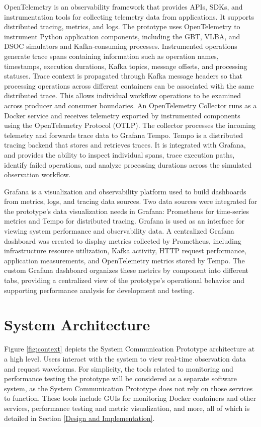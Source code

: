 \documentclass[12pt]{article}
\begin{document}
OpenTelemetry is an observability framework that provides APIs, SDKs, and instrumentation tools for collecting telemetry data from applications. It supports distributed tracing, metrics, and logs. The prototype uses OpenTelemetry to instrument Python application components, including the GBT, VLBA, and DSOC simulators and Kafka-consuming processes. Instrumented operations generate trace spans containing information such as operation names, timestamps, execution durations, Kafka topics, message offsets, and processing statuses. Trace context is propagated through Kafka message headers so that processing operations across different containers can be associated with the same distributed trace. This allows individual workflow operations to be examined across producer and consumer boundaries. An OpenTelemetry Collector runs as a Docker service and receives telemetry exported by instrumented components using the OpenTelemetry Protocol (OTLP). The collector processes the incoming telemetry and forwards trace data to Grafana Tempo. Tempo is a distributed tracing backend that stores and retrieves traces. It is integrated with Grafana, and provides the ability to inspect individual spans, trace execution paths, identify failed operations, and analyze processing durations across the simulated observation workflow.

Grafana is a visualization and observability platform used to build dashboards from metrics, logs, and tracing data sources. Two data sources were integrated for the prototype's data visualization needs in Grafana: Prometheus for time-series metrics and Tempo for distributed tracing. Grafana is used as an interface for viewing system performance and observability data. A centralized Grafana dashboard was created to display metrics collected by Prometheus, including infrastructure resource utilization, Kafka activity, HTTP request performance, application measurements, and OpenTelemetry metrics stored by Tempo. The custom Grafana dashboard organizes these metrics by component into different tabs, providing a centralized view of the prototype's operational behavior and supporting performance analysis for development and testing.

\section{System Architecture} \label{System Architecture}

  Figure \ref{fig:context} depicts the System Communication Prototype architecture at a high level. Users interact with the system to view real-time observation data and request waveforms. For simplicity, the tools related to monitoring and performance testing the prototype will be considered as a separate software system, as the System Communication Prototype does not rely on those services to function. These tools include GUIs for monitoring Docker containers and other services, performance testing and metric visualization, and more, all of which is detailed in Section \ref{Design and Implementation}.
\end{document}

